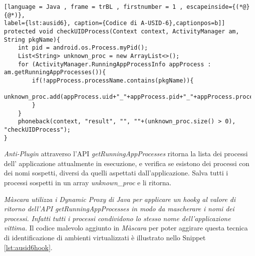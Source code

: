 \begin{lstlisting}[language = Java , frame = trBL , firstnumber = 1 , escapeinside={(*@}{@*)},
label={lst:ausid6}, caption={Codice di A-USID-6},captionpos=b]]
protected void checkUIDProcess(Context context, ActivityManager am,  String pkgName){
    int pid = android.os.Process.myPid();
    List<String> unknown_proc = new ArrayList<>();
    for (ActivityManager.RunningAppProcessInfo appProcess : am.getRunningAppProcesses()){
        if(!appProcess.processName.contains(pkgName)){
            unknown_proc.add(appProcess.uid+"_"+appProcess.pid+"_"+appProcess.processName);
        }
    }
    phoneback(context, "result", "", ""+(unknown_proc.size() > 0), "checkUIDProcess");
}
\end{lstlisting}

\emph{Anti-Plugin} attraverso l'API \emph{getRunningAppProcesses} ritorna la lista dei processi dell' applicazione attualmente in esecuzione, e verifica se esistono dei processi con dei nomi sospetti, diversi da quelli aspettati dall'applicazione. Salva tutti i processi sospetti in un array \emph{unknown\_proc} e li ritorna.

\emph{Màscara utilizza i Dynamic Proxy di Java per applicare un \gls{hookg} al valore di ritorno dell'API
getRunningAppProcesses in modo da mascherare i nomi dei processi. Infatti tutti i processi condividono lo stesso nome dell'applicazione vittima.}
Il codice malevolo aggiunto in \emph{Màscara} per poter aggirare questa tecnica di identificazione di ambienti virtualizzati è illustrato nello Snippet \ref{lst:ausid6hook}.

\newpage

